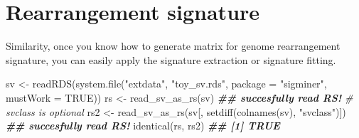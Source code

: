 \documentclass[
  12pt,
  a4paper,
  twoside]{book}
\newenvironment{Shaded}{\begin{snugshade}}{\end{snugshade}}
\newcommand{\AttributeTok}[1]{\textcolor[rgb]{0.77,0.63,0.00}{#1}}
\newcommand{\CommentTok}[1]{\textcolor[rgb]{0.56,0.35,0.01}{\textit{#1}}}
\newcommand{\ConstantTok}[1]{\textcolor[rgb]{0.00,0.00,0.00}{#1}}
\newcommand{\DocumentationTok}[1]{\textcolor[rgb]{0.56,0.35,0.01}{\textbf{\textit{#1}}}}
\newcommand{\FunctionTok}[1]{\textcolor[rgb]{0.00,0.00,0.00}{#1}}
\newcommand{\NormalTok}[1]{#1}
\newcommand{\OtherTok}[1]{\textcolor[rgb]{0.56,0.35,0.01}{#1}}
\newcommand{\StringTok}[1]{\textcolor[rgb]{0.31,0.60,0.02}{#1}}
\begin{document}
\hypertarget{rearrangement-signature}{%
\section{Rearrangement signature}\label{rearrangement-signature}}

Similarity, once you know how to generate matrix for genome rearrangement signature,
you can easily apply the signature extraction or signature fitting.

\begin{Shaded}
\begin{Highlighting}[]
\NormalTok{sv }\OtherTok{\textless{}{-}} \FunctionTok{readRDS}\NormalTok{(}\FunctionTok{system.file}\NormalTok{(}\StringTok{"extdata"}\NormalTok{, }\StringTok{"toy\_sv.rds"}\NormalTok{, }\AttributeTok{package =} \StringTok{"sigminer"}\NormalTok{, }\AttributeTok{mustWork =} \ConstantTok{TRUE}\NormalTok{))}
\NormalTok{rs }\OtherTok{\textless{}{-}} \FunctionTok{read\_sv\_as\_rs}\NormalTok{(sv)}
\DocumentationTok{\#\# succesfully read RS!}
\CommentTok{\# svclass is optional}
\NormalTok{rs2 }\OtherTok{\textless{}{-}} \FunctionTok{read\_sv\_as\_rs}\NormalTok{(sv[, }\FunctionTok{setdiff}\NormalTok{(}\FunctionTok{colnames}\NormalTok{(sv), }\StringTok{"svclass"}\NormalTok{)])}
\DocumentationTok{\#\# succesfully read RS!}
\FunctionTok{identical}\NormalTok{(rs, rs2)}
\DocumentationTok{\#\# [1] TRUE}


\end{Highlighting}
\end{Shaded}
\end{document}
